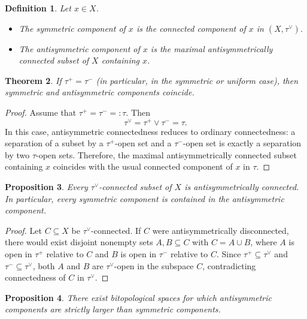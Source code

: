 \documentclass[preprint,12pt]{elsarticle}
\newtheorem{theorem}{Theorem}[section]
\newtheorem{proposition}[theorem]{Proposition}
\newtheorem{definition}[theorem]{Definition}
\begin{document}
\begin{definition}
\label{def:components}
Let $x\in X$.
\begin{itemize}
\item The \emph{symmetric component} of $x$ is the connected component
of $x$ in $(X,\tau^\vee)$.
\item The \emph{antisymmetric component} of $x$ is the maximal
antisymmetrically connected subset of $X$ containing $x$.
\end{itemize}
\end{definition}

\begin{theorem}
\label{thm:component-coincidence}
If $\tau^{+}=\tau^{-}$ (in particular, in the symmetric or uniform
case), then symmetric and antisymmetric components coincide.
\end{theorem}

\begin{proof}
Assume that $\tau^{+}=\tau^{-}=: \tau$. Then
\[
\tau^\vee=\tau^{+}\vee\tau^{-}=\tau.
\]
In this case, antisymmetric connectedness reduces to ordinary
connectedness: a separation of a subset by a $\tau^{+}$-open set and a
$\tau^{-}$-open set is exactly a separation by two $\tau$-open sets.
Therefore, the maximal antisymmetrically connected subset containing
$x$ coincides with the usual connected component of $x$ in $\tau$.
\end{proof}

\begin{proposition}
\label{prop:symmetric-in-antisymmetric}
Every $\tau^\vee$-connected subset of $X$ is antisymmetrically connected.
In particular, every symmetric component is contained in the
antisymmetric component.
\end{proposition}

\begin{proof}
Let $C\subseteq X$ be $\tau^\vee$-connected. If $C$ were antisymmetrically
disconnected, there would exist disjoint nonempty sets $A,B\subseteq C$
with $C=A\cup B$, where $A$ is open in $\tau^{+}$ relative to $C$ and $B$
is open in $\tau^{-}$ relative to $C$. Since $\tau^{+}\subseteq\tau^\vee$
and $\tau^{-}\subseteq\tau^\vee$, both $A$ and $B$ are $\tau^\vee$-open in
the subspace $C$, contradicting connectedness of $C$ in $\tau^\vee$.
\end{proof}

\begin{proposition}
\label{prop:strictness-components}
There exist bitopological spaces for which antisymmetric components are
strictly larger than symmetric components.
\end{proposition}
\end{document}
